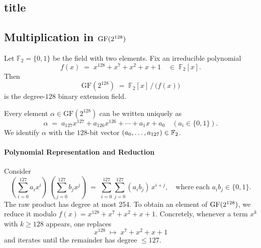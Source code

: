 \newpage
\subsection{title}







\iffalse
\subsection{Multiplication in $\operatorname{GF}(2^{128})$}
\begin{definition}
	Let \(\mathbb F_2 = \{0,1\}\) be the field with two elements.  Fix an irreducible polynomial
	\[
	f(x) \;=\; x^{128} + x^7 + x^2 + x + 1 
	\quad\in\; \mathbb F_2[x].
	\]
	Then
	\[
	\mathrm{GF}(2^{128}) \;=\; \mathbb F_2[x] \,\big/\,\bigl(f(x)\bigr)
	\]
	is the degree-\(128\) binary extension field.
\end{definition}
\begin{remark}
Every element \(\alpha\in\mathrm{GF}(2^{128})\) can be written uniquely as \[
\alpha \;=\; a_{127}x^{127} + a_{126}x^{126} + \cdots + a_1 x + a_0
\quad(a_i\in\{0,1\}).
\] We identify \(\alpha\) with the \(128\)-bit vector \((a_{0},\dots,a_{127})\in\mathbb{F}_2\).
\end{remark}

\paragraph{Polynomial Representation and Reduction}
Consider \[
\left(\sum_{i=0}^{127}a_i x^i\right)\,\left(\sum_{j=0}^{127}b_j x^j\right)
\;=\;\sum_{i=0}^{127}\sum_{j=0}^{127}(a_i b_j)\,x^{i+j},\quad\text{where each $a_i b_j\in\{0,1\}$}.
\] The raw product has degree at most 254.  To obtain an element of 
\(\operatorname{GF}(2^{128})\), we reduce it modulo $
f(x)=x^{128}+x^7+x^2+x+1$.
Concretely, whenever a term \(x^k\) with \(k\ge128\) appears, one replaces 
\[
x^{128}\;\mapsto\;x^7+x^2+x+1
\]
and iterates until the remainder has degree \(\le127\).

